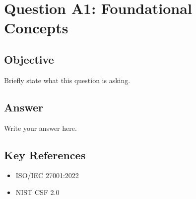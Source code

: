 
\section{Question A1: Foundational Concepts}

\subsection*{Objective}

Briefly state what this question is asking.

\vspace{1em}

\subsection*{Answer}

Write your answer here.

\vspace{1em}

\subsection*{Key References}

\begin{itemize}
    \item ISO/IEC 27001:2022
    \item NIST CSF 2.0
\end{itemize}
